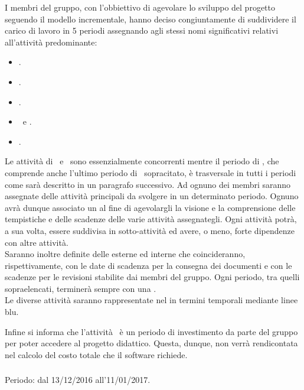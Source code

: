I membri del gruppo, con l'obbiettivo di agevolare lo sviluppo del progetto seguendo il modello incrementale, hanno deciso congiuntamente di suddividere il carico di lavoro in 5 periodi assegnando agli stessi nomi significativi relativi all'attività predominante:
\begin{itemize}
	\item \ARM.
	\item \ARD.
	\item \PA.
	\item \PD\ e \COD.
	\item \VV.
\end{itemize}
Le attività di \PD\ e \COD\ sono essenzialmente concorrenti mentre il periodo di , che comprende anche l'ultimo periodo di \VV\ sopracitato, è trasversale in tutti i periodi come sarà descritto in un paragrafo successivo.
Ad ognuno dei membri saranno assegnate delle attività principali da svolgere in un determinato periodo. Ognuno avrà dunque associato un  al fine di agevolargli la visione e la comprensione delle tempistiche e delle scadenze delle varie attività assegnategli.
Ogni attività potrà, a sua volta, essere suddivisa in sotto-attività ed avere, o meno, forte dipendenze con altre attività.\\
Saranno inoltre definite delle  esterne ed interne che coincideranno, rispettivamente, con le date di scadenza per la consegna dei documenti e con le scadenze per le revisioni stabilite dai membri del gruppo.
Ogni periodo, tra quelli sopraelencati, terminerà sempre con una .\\

Le diverse attività saranno rappresentate nel  in termini temporali mediante linee blu.

Infine si informa che l'attività \ARM\ è un periodo di investimento da parte del gruppo per poter accedere al progetto didattico. Questa, dunque, non verrà rendicontata nel calcolo del costo totale che il software richiede.
\newpage
\subsubsection{\ARM}
Periodo: dal 13/12/2016 all'11/01/2017. \\

